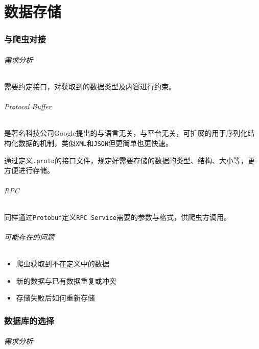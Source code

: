 \documentclass[UTF8]{ctexrep}
\begin{document}

\part{数据存储}

\section{与爬虫对接}

\paragraph{需求分析}

需要约定接口，对获取到的数据类型及内容进行约束。

\paragraph{Protocal Buffer}

是著名科技公司\textmd{Google}提出的与语言无关，与平台无关，可扩展的用于序列化结构化数据的机制，类似\texttt{XML}和\texttt{JSON}但更简单也更快速。

\par
通过定义\texttt{.proto}的接口文件，规定好需要存储的数据的类型、结构、大小等，更方便进行存储。

\paragraph{RPC}

同样通过\texttt{Protobuf}定义\texttt{RPC Service}需要的参数与格式，供爬虫方调用。

\paragraph{可能存在的问题}

\begin{itemize}
    \item 爬虫获取到不在定义中的数据
    \item 新的数据与已有数据重复或冲突
    \item 存储失败后如何重新存储
\end{itemize}

\section{数据库的选择}

\paragraph{需求分析}
\end{document}
